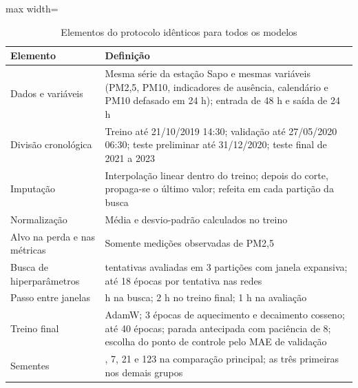 \begin{table}[!htbp]
    \centering
    \caption{Elementos do protocolo idênticos para todos os modelos}
    \label{tab:protocolo_igual}
    \small
    \begin{adjustbox}{max width=\textwidth}
    \begin{tabular}{l>{\raggedright\arraybackslash}p{}}
        \toprule
        Elemento & Definição \\
        \midrule
        Dados e variáveis & Mesma série da estação Sapo e mesmas variáveis (PM2,5, PM10, indicadores de ausência, calendário e PM10 defasado em 24 h); entrada de 48 h e saída de 24 h \\
        Divisão cronológica & Treino até 21/10/2019 14:30; validação até 27/05/2020 06:30; teste preliminar até 31/12/2020; teste final de 2021 a 2023 \\
        Imputação & Interpolação linear dentro do treino; depois do corte, propaga-se o último valor; refeita em cada partição da busca \\
        Normalização & Média e desvio-padrão calculados no treino \\
        Alvo na perda e nas métricas & Somente medições observadas de PM2,5 \\
        Busca de hiperparâmetros & 24 tentativas avaliadas em 3 partições com janela expansiva; até 18 épocas por tentativa nas redes \\
        Passo entre janelas & 4 h na busca; 2 h no treino final; 1 h na avaliação \\
        Treino final & AdamW; 3 épocas de aquecimento e decaimento cosseno; até 40 épocas; parada antecipada com paciência de 8; escolha do ponto de controle pelo MAE de validação \\
        Sementes & 42, 7, 21 e 123 na comparação principal; as três primeiras nos demais grupos \\
        \bottomrule
    \end{tabular}
    \end{adjustbox}
\end{table}
